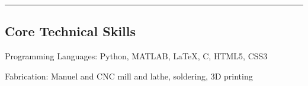 \documentclass[10pt,letterpaper]{article}
\newenvironment{indentsection}[1]%
{\begin{list}{}%
	{\setlength{\leftmargin}{#1}}%
	\item[]%
}
{\end{list}}
\begin{document}

% 
% 

\hrule
\vspace{-0.3em}
\subsection*{Core Technical Skills}

\begin{indentsection}{\parindent}
\begin{description*}
	\item[Programming Languages:]
	Python, MATLAB, \LaTeX, C, HTML5, CSS3
	\item[Fabrication:]
	Manuel and CNC mill and lathe, soldering, 3D printing
\end{description*}
\end{indentsection}
\end{document}
